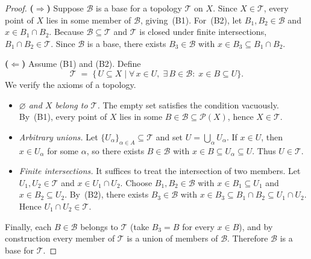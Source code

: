 \documentclass[11pt,a4paper,twoside]{book}
\theoremstyle{remark}
\theoremstyle{definition}
\theoremstyle{definition}
\begin{document}
\begin{proof}
\textbf{($\Rightarrow$)}
Suppose $\mathscr{B}$ is a base for a topology $\mathscr{T}$ on $X$.  Since
$X\in\mathscr{T}$, every point of $X$ lies in some member of $\mathscr{B}$,
giving~(B1).  For~(B2), let $B_1,B_2\in\mathscr{B}$ and $x\in B_1\cap B_2$.
Because $\mathscr{B}\subseteq\mathscr{T}$ and $\mathscr{T}$ is closed under
finite intersections, $B_1\cap B_2\in\mathscr{T}$.  Since $\mathscr{B}$ is a
base, there exists $B_3\in\mathscr{B}$ with $x\in B_3\subseteq B_1\cap B_2$.

\medskip\noindent
\textbf{($\Leftarrow$)}
Assume (B1) and (B2).  Define
\[
    \mathscr{T}
    \;=\;
    \bigl\{\, U\subseteq X \;\big|\;
        \forall\, x\in U,\;\exists\, B\in\mathscr{B}:\;
        x\in B\subseteq U
    \bigr\}.
\]
We verify the axioms of a topology.

\begin{itemize}
    \item \emph{$\varnothing$ and $X$ belong to $\mathscr{T}$.}\;
        The empty set satisfies the condition vacuously.  By~(B1), every point
        of $X$ lies in some $B\in\mathscr{B}\subseteq\mathscr{P}(X)$, hence
        $X\in\mathscr{T}$.

    \item \emph{Arbitrary unions.}\;
        Let $\{U_\alpha\}_{\alpha\in A}\subseteq\mathscr{T}$ and set
        $U=\bigcup_\alpha U_\alpha$.  If $x\in U$, then $x\in U_\alpha$ for
        some $\alpha$, so there exists $B\in\mathscr{B}$ with
        $x\in B\subseteq U_\alpha\subseteq U$.  Thus $U\in\mathscr{T}$.

    \item \emph{Finite intersections.}\;
        It suffices to treat the intersection of two members.  Let
        $U_1,U_2\in\mathscr{T}$ and $x\in U_1\cap U_2$.  Choose
        $B_1,B_2\in\mathscr{B}$ with $x\in B_1\subseteq U_1$ and
        $x\in B_2\subseteq U_2$.  By~(B2), there exists $B_3\in\mathscr{B}$
        with $x\in B_3\subseteq B_1\cap B_2\subseteq U_1\cap U_2$.  Hence
        $U_1\cap U_2\in\mathscr{T}$.
\end{itemize}

Finally, each $B\in\mathscr{B}$ belongs to $\mathscr{T}$ (take $B_3=B$ for
every $x\in B$), and by construction every member of $\mathscr{T}$ is a union
of members of $\mathscr{B}$.  Therefore $\mathscr{B}$ is a base for
$\mathscr{T}$.
\end{proof}

\end{document}
